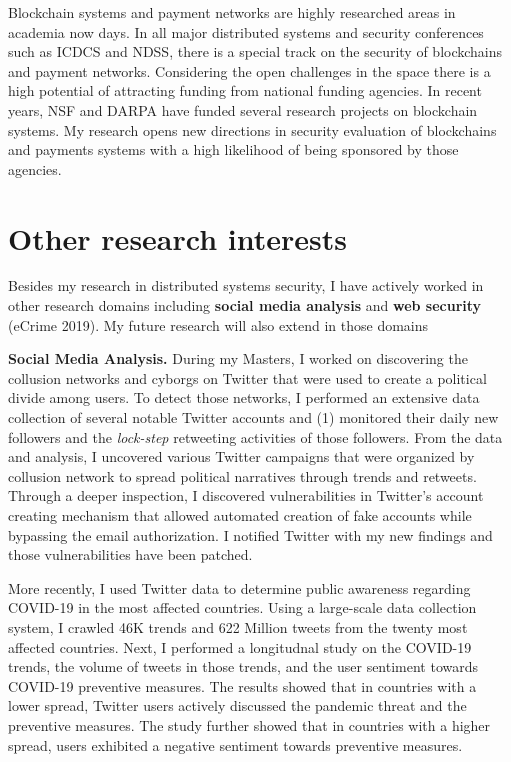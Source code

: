 \documentclass{NSF}
\newcommand{\BfPara}[1]{{\noindent\textbf{#1.}}\xspace}
\begin{document}
Blockchain systems and payment networks are highly researched areas in academia now days. In all major distributed systems and security conferences such as ICDCS and NDSS, there is a special track on the security of blockchains and payment networks. Considering the open challenges in the space there is a high potential of attracting funding from national funding agencies. In recent years, NSF and DARPA have funded several research projects on blockchain systems. My research opens new directions in security evaluation of blockchains and payments systems with a high likelihood of being sponsored by those agencies. 



\section{Other research interests} \vspace{-1mm}
Besides my research in distributed systems security, I have actively worked in other research domains including \textbf{social media analysis} and \textbf{web security} (eCrime 2019). My future research will also extend in those domains 


\BfPara{Social Media Analysis} During my Masters, I worked on discovering the collusion networks and cyborgs on Twitter that were used to create a political divide among users. To detect those networks, I performed an extensive data collection of several notable Twitter accounts and (1) monitored their daily new followers and the {\em lock-step} retweeting activities of those followers. From the data and analysis, I uncovered various Twitter campaigns that were organized by collusion network to spread political narratives through trends and retweets. Through a deeper inspection, I discovered vulnerabilities in Twitter's account creating mechanism that allowed automated creation of fake accounts while bypassing the email authorization. I notified Twitter with my new findings and those vulnerabilities have been patched.  

More recently, I used Twitter data to determine public awareness regarding COVID-19 in the most affected countries. Using a large-scale data collection system, I crawled 46K trends and 622 Million tweets from the twenty most affected countries. Next, I performed a longitudnal study on the COVID-19 trends, the volume of tweets in those trends, and the user sentiment towards COVID-19 preventive measures. The results showed that in countries with a lower spread, Twitter users actively discussed the pandemic threat and the preventive measures. The study further showed that in countries with a higher spread, users exhibited a negative sentiment towards preventive measures. 
\end{document}

